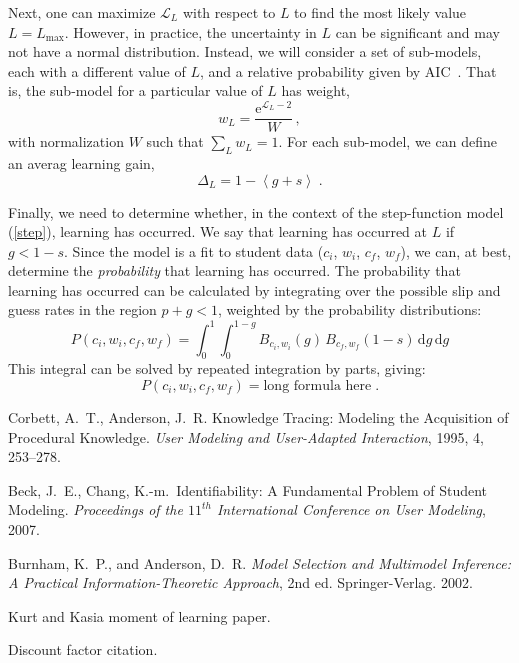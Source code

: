 \documentclass[11pt,letterpaper]{article}
\begin{document}
%
Next, one can maximize $\mathcal{L}_L$ with respect to $L$ to find
the most likely value $L=L_\mathrm{max}$.  However, in practice, the 
uncertainty in $L$ can be significant and may not have a normal
distribution.   Instead, we will consider a set of sub-models, each with a 
different value of $L$, and a relative probability given by 
AIC~\cite{aic-book}.  
That is, the sub-model for a particular value of $L$ has weight,
%
\begin{equation}
                   w_L = \frac{\mathrm{e}^{\mathcal{L}_L-2} }{W}\, ,
\end{equation}
%
with normalization $W$ such that $\sum_L w_L=1$.
For each sub-model, we can define an averag learning gain,
%
\begin{equation}
         \Delta_L = 1- \left\langle g+s \right\rangle \; .
\end{equation}

Finally, we need to determine whether, in the context
of the step-function model (\ref{step}), learning has occurred.
We say that learning has occurred at $L$ if $g<1-s$.
Since the model is a fit to student data ($c_i$, $w_i$, $c_f$, $w_f$), 
we can, at best, determine the {\em probability} that learning has occurred. 
The probability that learning has occurred can be calculated by
integrating over the possible slip and guess rates in the region
$p+g<1$, weighted by the probability distributions:
%
\begin{equation}
   P(c_i, w_i, c_f, w_f)= \int_0^1 \int_0^{1-g} 
   B_{c_i,w_i}(g) \, B_{c_f,w_f}(1-s) \,\mathrm{d}g\,\mathrm{d}g 
\end{equation}
%
This integral can be solved by repeated integration by parts,
giving:
%
\begin{equation}
   P(c_i, w_i, c_f, w_f)= \mbox{long formula here} \; .
\end{equation}




\begin{thebibliography}{9}

  Corbett, A.\ T., Anderson, J.\ R. Knowledge Tracing:  Modeling 
the Acquisition of Procedural Knowledge.  \emph{User Modeling and
 User-Adapted Interaction}, 1995, 4, 253--278.

  Beck, J.\ E., Chang, K.-m.\ Identifiability: A Fundamental Problem of
  Student Modeling.
  \emph{Proceedings of the $11^{th}$ International Conference on User 
    Modeling}, 2007.

Burnham, K.~P., and Anderson, D.~R. \emph{Model
  Selection and Multimodel Inference: A Practical
  Information-Theoretic Approach}, 2nd ed. Springer-Verlag. 2002.

Kurt and Kasia moment of learning paper.

Discount factor citation.

\end{thebibliography}
\end{document}
